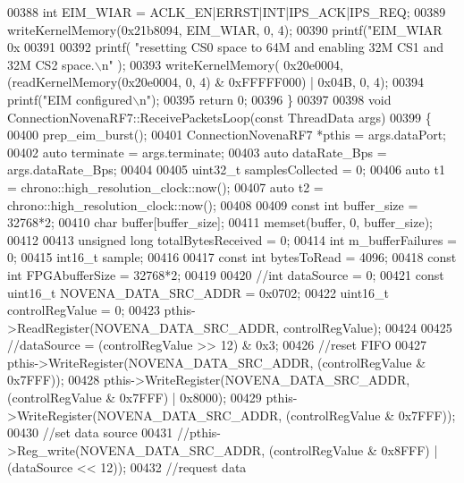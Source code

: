 \begin{DoxyCode}
{{{{{{{{{{00388     \textcolor{keywordtype}{int} EIM\_WIAR = ACLK\_EN|ERRST|INT|IPS\_ACK|IPS\_REQ;
00389     writeKernelMemory(0x21b8094, EIM\_WIAR, 0, 4);
00390     printf(\textcolor{stringliteral}{"EIM\_WIAR 0x%
00391 
00392     printf( \textcolor{stringliteral}{"resetting CS0 space to 64M and enabling 32M CS1 and 32M CS2 space.\(\backslash\)n"} );
00393     writeKernelMemory( 0x20e0004, (readKernelMemory(0x20e0004, 0, 4) & 0xFFFFF000) | 0x04B, 0, 4);
00394     printf(\textcolor{stringliteral}{"EIM configured\(\backslash\)n"});
00395     \textcolor{keywordflow}{return} 0;
00396 \}
00397 
00398 \textcolor{keywordtype}{void} ConnectionNovenaRF7::ReceivePacketsLoop(\textcolor{keyword}{const} ThreadData args)
00399 \{
00400     prep_eim_burst();
00401     ConnectionNovenaRF7 *pthis = args.dataPort;
00402     \textcolor{keyword}{auto} terminate = args.terminate;
00403     \textcolor{keyword}{auto} dataRate\_Bps = args.dataRate_Bps;
00404 
00405     uint32\_t samplesCollected = 0;
00406     \textcolor{keyword}{auto} t1 = chrono::high\_resolution\_clock::now();
00407     \textcolor{keyword}{auto} t2 = chrono::high\_resolution\_clock::now();
00408 
00409     \textcolor{keyword}{const} \textcolor{keywordtype}{int} buffer\_size = 32768*2;
00410     \textcolor{keywordtype}{char} buffer[buffer\_size];
00411     memset(buffer, 0, buffer\_size);
00412 
00413     \textcolor{keywordtype}{unsigned} \textcolor{keywordtype}{long} totalBytesReceived = 0;
00414     \textcolor{keywordtype}{int} m\_bufferFailures = 0;
00415     int16\_t sample;
00416 
00417     \textcolor{keyword}{const} \textcolor{keywordtype}{int} bytesToRead = 4096;
00418     \textcolor{keyword}{const} \textcolor{keywordtype}{int} FPGAbufferSize = 32768*2;
00419 
00420     \textcolor{comment}{//int dataSource = 0;}
00421     \textcolor{keyword}{const} uint16\_t NOVENA\_DATA\_SRC\_ADDR = 0x0702;
00422     uint16\_t controlRegValue = 0;
00423     pthis->ReadRegister(NOVENA\_DATA\_SRC\_ADDR, controlRegValue);
00424 
00425     \textcolor{comment}{//dataSource = (controlRegValue >> 12) & 0x3;}
00426     \textcolor{comment}{//reset FIFO}
00427     pthis->WriteRegister(NOVENA\_DATA\_SRC\_ADDR, (controlRegValue & 0x7FFF));
00428     pthis->WriteRegister(NOVENA\_DATA\_SRC\_ADDR, (controlRegValue & 0x7FFF) | 0x8000);
00429     pthis->WriteRegister(NOVENA\_DATA\_SRC\_ADDR, (controlRegValue & 0x7FFF));
00430     \textcolor{comment}{//set data source}
00431     \textcolor{comment}{//pthis->Reg\_write(NOVENA\_DATA\_SRC\_ADDR, (controlRegValue & 0x8FFF) | (dataSource << 12));}
00432     \textcolor{comment}{//request data}
}}}}}}}}}}}
\end{DoxyCode}
